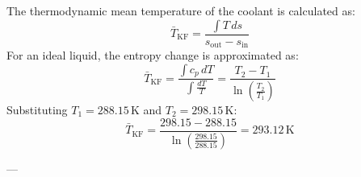 The thermodynamic mean temperature of the coolant is calculated as:  
\[
\bar{T}_{\text{KF}} = \frac{\int T \, ds}{s_{\text{out}} - s_{\text{in}}}
\]  
For an ideal liquid, the entropy change is approximated as:  
\[
\bar{T}_{\text{KF}} = \frac{\int c_p \, dT}{\int \frac{dT}{T}} = \frac{T_2 - T_1}{\ln \left( \frac{T_2}{T_1} \right)}
\]  
Substituting \( T_1 = 288.15 \, \text{K} \) and \( T_2 = 298.15 \, \text{K} \):  
\[
\bar{T}_{\text{KF}} = \frac{298.15 - 288.15}{\ln \left( \frac{298.15}{288.15} \right)} = 293.12 \, \text{K}
\]  

---